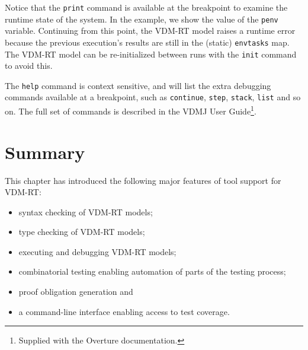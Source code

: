 \noindent Notice that the \verb|print| command is available at the breakpoint
to examine the runtime state of the system. In the example, we show the value
of the \verb|penv| variable. Continuing from this point, the VDM-RT model
raises a runtime error because the previous execution's results are still in
the (static) \verb|envtasks| map. The VDM-RT model can be re-initialized
between runs with the \verb|init| command to avoid this.

The \verb|help| command is context sensitive, and will list the extra debugging
commands available at a breakpoint, such as \verb|continue|, \verb|step|,
\verb|stack|, \verb|list| and so on. The full set of commands is described in the
VDMJ User Guide\footnote{Supplied with the Overture documentation.}.

\lstset{style=mystyle}

\lstset{style=mystyle,language=VDM++}

\section{Summary}\label{sec:toolintrosummary}

This chapter has introduced the following major features of tool
support for VDM-RT:
\begin{itemize}
\item syntax checking of VDM-RT models;
\item type checking of VDM-RT models;
\item executing and debugging VDM-RT models;
\item combinatorial testing enabling automation of parts of the
  testing process; 
\item proof obligation generation and
\item a command-line interface enabling access to test coverage.
\end{itemize}
